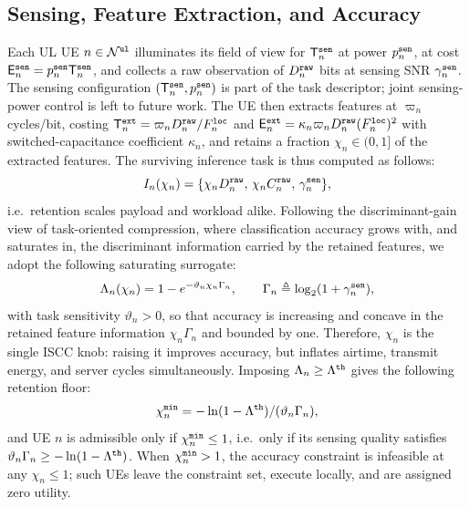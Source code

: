\documentclass[journal]{IEEEtran}
\begin{document}
\subsection{Sensing, Feature Extraction, and Accuracy}
\label{sec:sense}
Each UL UE $n\in\mathcal{N}^{\tt ul}$ illuminates its field of view for $\mathsf{T}_n^{\tt sen}$ at power $p_n^{\tt sen}$, at cost $\mathsf{E}_n^{\tt sen}=p_n^{\tt sen}\mathsf{T}_n^{\tt sen}$, and collects a raw observation of $D_n^{\tt raw}$ bits at sensing SNR $\gamma_n^{\tt sen}$. The sensing configuration $(\mathsf{T}_n^{\tt sen},p_n^{\tt sen})$ is part of the task descriptor; joint sensing-power control is left to future work. The UE then extracts features at $\varpi_n$ cycles/bit, costing $\mathsf{T}_n^{\tt ext}=\varpi_n D_n^{\tt raw}/F_n^{\tt loc}$ and $\mathsf{E}_n^{\tt ext}=\kappa_n\varpi_n D_n^{\tt raw}(F_n^{\tt loc})^2$ with switched-capacitance coefficient $\kappa_n$, and retains a fraction $\chi_n\in(0,1]$ of the extracted features. The surviving inference task is thus computed as follows:
\begin{equation}
I_n(\chi_n)=\{\chi_n D_n^{\tt raw},\,\chi_n C_n^{\tt raw},\,\gamma_n^{\tt sen}\},
\label{eq:task}
\end{equation}
i.e.\ retention scales payload and workload alike. Following the discriminant-gain view of task-oriented compression, where classification accuracy grows with, and saturates in, the discriminant information carried by the retained features, we adopt the following saturating surrogate:
\begin{equation}
\Lambda_n(\chi_n)=1-e^{-\vartheta_n\chi_n \Gamma_n},
\qquad
\Gamma_n\triangleq\log_2(1+\gamma_n^{\tt sen}),
\label{eq:acc}
\end{equation}
with task sensitivity $\vartheta_n>0$, so that accuracy is increasing and concave in the retained feature information $\chi_n\Gamma_n$ and bounded by one. 
Therefore, $\chi_n$ is the single ISCC knob: raising it improves accuracy, but inflates airtime, transmit energy, and server cycles simultaneously. Imposing $\Lambda_n\ge\Lambda^{\tt th}$ gives the following retention floor:
\begin{equation}
\chi_n^{\tt min}=-\ln(1-\Lambda^{\tt th})/(\vartheta_n \Gamma_n),
\label{eq:chimin}
\end{equation}
and UE $n$ is admissible only if $\chi_n^{\tt min}\le 1$, i.e.\ only if its sensing quality satisfies $\vartheta_n \Gamma_n\ge-\ln(1-\Lambda^{\tt th})$. 
When $\chi_n^{\tt min}>1$, the accuracy constraint is infeasible at any $\chi_n\le1$; such UEs leave the constraint set, execute locally, and are assigned zero utility.
\end{document}
